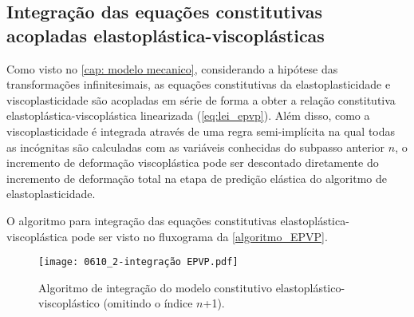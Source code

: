 \subsection{Integração das equações constitutivas acopladas elastoplástica-viscoplásticas}
Como visto no \autoref{cap: modelo mecanico}, considerando a hipótese das transformações infinitesimais, as equações constitutivas da elastoplasticidade e viscoplasticidade são acopladas em série de forma a obter a relação constitutiva elastoplástica-viscoplástica linearizada (\ref{eq:lei_epvp}). Além disso, como a viscoplasticidade é integrada através de uma regra semi-implícita na qual todas as incógnitas são calculadas com as variáveis conhecidas do subpasso anterior $n$, o incremento de deformação viscoplástica pode ser descontado diretamente do incremento de deformação total na etapa de predição elástica do algoritmo de elastoplasticidade.

O algoritmo para integração das equações constitutivas elastoplástica-viscoplástica pode ser visto no fluxograma da \autoref{algoritmo_EPVP}.
\begin{figure}[H]
	\begin{center}
		\texttt{[image: 0610\_2-integração EPVP.pdf]}
	\end{center}
	\caption{\label{algoritmo_EPVP}Algoritmo de integração do modelo constitutivo elastoplástico-viscoplástico (omitindo o índice $n$+1).}
\end{figure}

